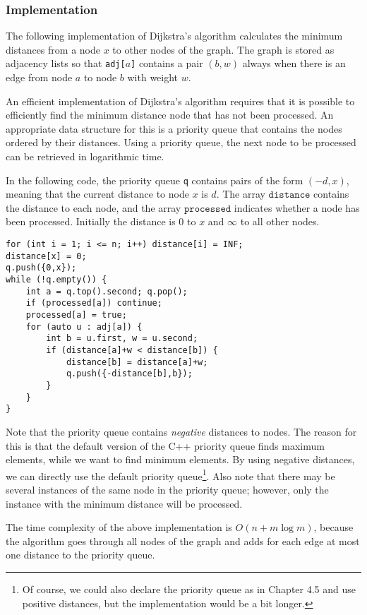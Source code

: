 \subsubsection{Implementation}

The following implementation of Dijkstra's algorithm
calculates the minimum distances from a node $x$
to other nodes of the graph.
The graph is stored as adjacency lists
so that \texttt{adj[$a$]} contains a pair $(b,w)$
always when there is an edge from node $a$ to node $b$
with weight $w$.

An efficient implementation of Dijkstra's algorithm
requires that it is possible to efficiently find the
minimum distance node that has not been processed.
An appropriate data structure for this is a priority queue
that contains the nodes ordered by their distances.
Using a priority queue, the next node to be processed
can be retrieved in logarithmic time.

In the following code, the priority queue
\texttt{q} contains pairs of the form $(-d,x)$,
meaning that the current distance to node $x$ is $d$.
The array $\texttt{distance}$ contains the distance to
each node, and the array $\texttt{processed}$ indicates
whether a node has been processed.
Initially the distance is $0$ to $x$ and $\infty$ to all other nodes.

\begin{lstlisting}
for (int i = 1; i <= n; i++) distance[i] = INF;
distance[x] = 0;
q.push({0,x});
while (!q.empty()) {
    int a = q.top().second; q.pop();
    if (processed[a]) continue;
    processed[a] = true;
    for (auto u : adj[a]) {
        int b = u.first, w = u.second;
        if (distance[a]+w < distance[b]) {
            distance[b] = distance[a]+w;
            q.push({-distance[b],b});
        }
    }
}
\end{lstlisting}

Note that the priority queue contains \emph{negative}
distances to nodes.
The reason for this is that the
default version of the C++ priority queue finds maximum
elements, while we want to find minimum elements.
By using negative distances,
we can directly use the default priority queue\footnote{Of
course, we could also declare the priority queue as in Chapter 4.5
and use positive distances, but the implementation would be a bit longer.}.
Also note that there may be several instances of the same
node in the priority queue; however, only the instance with the
minimum distance will be processed.

The time complexity of the above implementation is
$O(n+m \log m)$, because the algorithm goes through
all nodes of the graph and adds for each edge
at most one distance to the priority queue.


